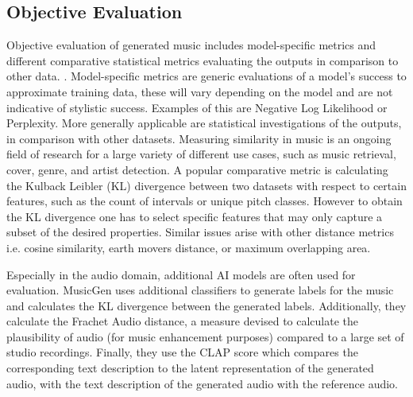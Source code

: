 \subsection{Objective Evaluation}

Objective evaluation of generated music includes model-specific metrics and different comparative statistical metrics evaluating the outputs in comparison to other data. \cite{Xiong_Wang_ai_eval_methods_2023}. Model-specific metrics are generic evaluations of a model's success to approximate training data, these will vary depending on the model and are not indicative of stylistic success. Examples of this are Negative Log Likelihood \cite{Huang_Vaswani_Uszkoreit_Shazeer_Simon_Hawthorne_Dai_Hoffman_Dinculescu_Eck_2018} or Perplexity\cite{Rütte_figaro_2023}. 
More generally applicable are statistical investigations of the outputs, in comparison with other datasets. Measuring similarity in music is an ongoing field of research \cite{Gurjar_Moon_similarity_2018} for a large variety of different use cases, such as music retrieval, cover, genre, and artist detection. A popular comparative metric is calculating the Kulback Leibler (KL) divergence between two datasets with respect to certain features, such as the count of intervals or unique pitch classes. However to obtain the KL divergence one has to select specific features that may only capture a subset of the desired properties. Similar issues arise with other distance metrics i.e. cosine similarity, earth movers distance, or maximum overlapping area. 

Especially in the audio domain, additional AI models are often used for evaluation. MusicGen \cite{copet2023simple} uses additional classifiers to generate labels for the music and calculates the KL divergence between the generated labels. Additionally, they calculate the Frachet Audio distance, a measure devised to calculate the plausibility of audio (for music enhancement purposes) compared to a large set of studio recordings\cite{Kilgour_Frachet_2019}. Finally, they use the CLAP score which compares the corresponding text description to the latent representation of the generated audio, with the text description of the generated audio with the reference audio. \cite{Elizalde_Deshmukh_Ismail_Wang_2023}
